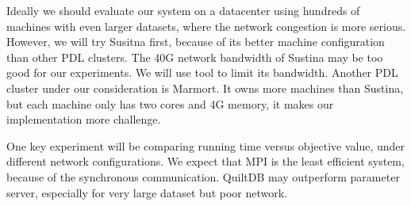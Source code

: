 \documentclass[11pt, twocolumn]{article}
\begin{document}
Ideally we should evaluate our system on a datacenter using hundreds of
machines with even larger datasets, where the network congestion is more
serious. However, we will try Susitna first, because of its better machine
configuration than other PDL clusters. The 40G network bandwidth of Sustina may
be too good for our experiments. We will use tool to limit its
bandwidth. Another PDL cluster under our consideration is Marmort. It owns more
machines than Sustina, but each machine only has two cores and 4G memory, it
makes our implementation more challenge.

One key experiment will be comparing running time versus objective value, under
different network configurations. We expect that MPI is the least efficient
system, because of the synchronous communication. QuiltDB may outperform
parameter server, especially for very large dataset but poor network.


%


\end{document}
